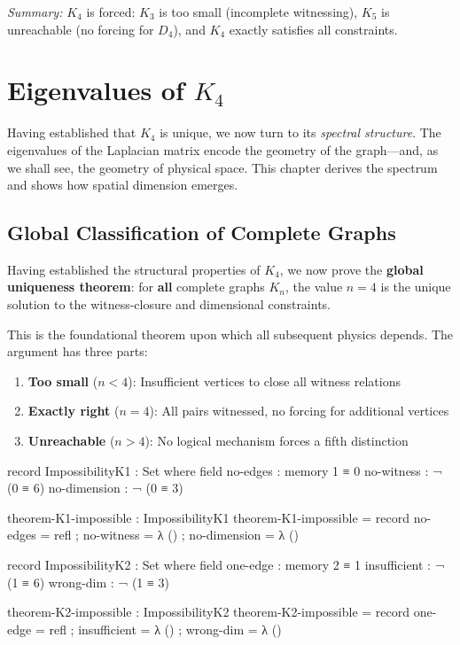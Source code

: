 \documentclass[11pt,a4paper]{book}
\begin{document}
\medskip
\noindent\textit{Summary:} $K_4$ is forced: $K_3$ is too small (incomplete witnessing), 
$K_5$ is unreachable (no forcing for $D_4$), and $K_4$ exactly satisfies all constraints.

\chapter{Eigenvalues of $K_4$}
\label{chap:spectral-theory}

Having established that $K_4$ is unique, we now turn to its \emph{spectral structure}. 
The eigenvalues of the Laplacian matrix encode the geometry of the graph—and, as we shall 
see, the geometry of physical space. This chapter derives the spectrum and shows how 
spatial dimension emerges.

\section{Global Classification of Complete Graphs}
\label{sec:global-classification}

Having established the structural properties of $K_4$, we now prove the \textbf{global uniqueness theorem}: for \textbf{all} complete graphs $K_n$, the value $n = 4$ is the unique solution to the witness-closure and dimensional constraints.

This is the foundational theorem upon which all subsequent physics depends. The argument has three parts:
\begin{enumerate}
\item \textbf{Too small} ($n < 4$): Insufficient vertices to close all witness relations
\item \textbf{Exactly right} ($n = 4$): All pairs witnessed, no forcing for additional vertices
\item \textbf{Unreachable} ($n > 4$): No logical mechanism forces a fifth distinction
\end{enumerate}

\begin{code}
record ImpossibilityK1 : Set where
  field
    no-edges      : memory 1 ≡ 0
    no-witness    : ¬ (0 ≡ 6)
    no-dimension  : ¬ (0 ≡ 3)

theorem-K1-impossible : ImpossibilityK1
theorem-K1-impossible = record
  { no-edges     = refl
  ; no-witness   = λ ()
  ; no-dimension = λ ()
  }

record ImpossibilityK2 : Set where
  field
    one-edge      : memory 2 ≡ 1
    insufficient  : ¬ (1 ≡ 6)
    wrong-dim     : ¬ (1 ≡ 3)

theorem-K2-impossible : ImpossibilityK2
theorem-K2-impossible = record
  { one-edge     = refl
  ; insufficient = λ ()
  ; wrong-dim    = λ ()
  }
\end{code}
\end{document}

